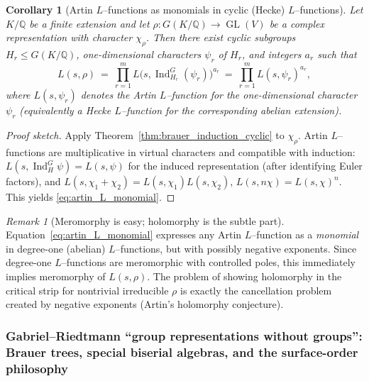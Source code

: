 \documentclass[11pt,oneside]{amsbook}
\numberwithin{equation}{section}
\theoremstyle{plain}
\newtheorem{corollary}[theorem]{Corollary}
\theoremstyle{definition}
\theoremstyle{remark}
\newtheorem{remark}[theorem]{Remark}
\newcommand{\Ind}{\operatorname{Ind}}
\DeclareMathOperator{\GL}{\mathrm{GL}}
\begin{document}
\begin{corollary}[Artin $L$--functions as monomials in cyclic (Hecke) $L$--functions]
\label{cor:artin_L_monomialization}
Let $K/\mathbb{Q}$ be a finite extension and let $\rho:G(K/\mathbb{Q})\to \GL(V)$ be a complex representation with character $\chi_\rho$.
Then there exist cyclic subgroups $H_r\le G(K/\mathbb{Q})$, one-dimensional characters $\psi_r$ of $H_r$, and integers $a_r$ such that
\begin{equation}
\label{eq:artin_L_monomial}
L(s,\rho)\ =\ \prod_{r=1}^m L\!\bigl(s,\Ind_{H_r}^G(\psi_r)\bigr)^{a_r}
\ =\ \prod_{r=1}^m L(s,\psi_r)^{a_r},
\end{equation}
where $L(s,\psi_r)$ denotes the Artin $L$--function for the one-dimensional character $\psi_r$ (equivalently a Hecke $L$--function for the corresponding abelian extension).
\end{corollary}

\begin{proof}[Proof sketch]
Apply Theorem~\ref{thm:brauer_induction_cyclic} to $\chi_\rho$.
Artin $L$--functions are multiplicative in virtual characters and compatible with induction:
$L(s,\Ind_{H}^G\psi)=L(s,\psi)$ for the induced representation (after identifying Euler factors), and
$L(s,\chi_1+\chi_2)=L(s,\chi_1)L(s,\chi_2)$, $L(s,n\chi)=L(s,\chi)^n$.
This yields \eqref{eq:artin_L_monomial}.
\end{proof}

\begin{remark}[Meromorphy is easy; holomorphy is the subtle part]
Equation~\eqref{eq:artin_L_monomial} expresses any Artin $L$--function as a \emph{monomial} in degree-one (abelian) $L$--functions, but with possibly negative exponents.
Since degree-one $L$--functions are meromorphic with controlled poles, this immediately implies meromorphy of $L(s,\rho)$.
The problem of showing holomorphy in the critical strip for nontrivial irreducible $\rho$ is exactly the cancellation problem created by negative exponents (Artin's holomorphy conjecture).
\end{remark}

\subsubsection{Gabriel--Riedtmann ``group representations without groups'': Brauer trees, special biserial algebras, and the surface-order philosophy}
\label{sec:gabriel_riedtmann_without_groups}
\end{document}
